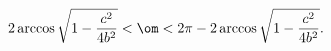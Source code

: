 \begin{equation*}
  2\arccos\sqrt{1-\frac{c^2}{4b^2}}<\om
  <2\pi-2\arccos\sqrt{1-\frac{c^2}{4b^2}}.
\end{equation*}

